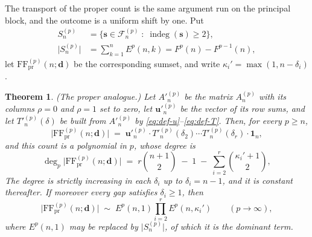 \documentclass[11pt, a4paper, abstract=yes]{scrartcl}
\theoremstyle{definition}
\theoremstyle{remark}
\theoremstyle{plain}
\newtheorem{theorem}[definition]{Theorem}
\newcommand{\vek}[1]{\boldsymbol{#1}}
\newcommand{\indeg}{\operatorname{indeg}}
\begin{document}
The transport of the proper count is the same argument run on the principal block, and the outcome
is a uniform shift by one. Put
\begin{align}
  S_n^{(p)} &= \bigl\lbrace\vek s\in\mathcal F_n^{(p)}\;:\;\indeg(\vek s)\ge2\bigr\rbrace,\label{eq:def-Snp}\\
  \lvert S_n^{(p)}\rvert &= \sum_{k=1}^{n}E^p(n,k)=F^p(n)-F^{p-1}(n) ,\label{eq:card-Snp}
\end{align}
let \(\mathrm{FF}^{(p)}_{\mathrm{pr}}(n;\vek d)\) be the corresponding sumset, and write
\(\kappa_i'=\max(1,n-\delta_i)\).

\begin{theorem}
(\emph{The proper analogue.}) Let \(A'^{(p)}_n\) be the matrix \(A^{(p)}_n\) with its columns \(\rho=0\)
and \(\rho=1\) set to zero, let \(\vek u'^{(p)}_n\) be the vector of its row sums, and let
\(T'^{(p)}_n(\delta)\) be built from \(A'^{(p)}_n\) by \eqref{eq:def-u}--\eqref{eq:def-T}. Then, for every
\(p\ge n\),
\begin{equation}\label{eq:proper-p-product}
  \lvert\mathrm{FF}^{(p)}_{\mathrm{pr}}(n;\vek d)\rvert
  \;=\;\vek u'^{(p)}_n\cdot T'^{(p)}_n(\delta_2)\cdots T'^{(p)}_n(\delta_r)\cdot\vek 1_n ,
\end{equation}
and this count is a polynomial in \(p\), whose degree is
\begin{equation}\label{eq:proper-degree-in-p}
  \deg_p\lvert\mathrm{FF}^{(p)}_{\mathrm{pr}}(n;\vek d)\rvert
   \;=\; r\binom{n+1}{2}\;-\;1\;-\;\sum_{i=2}^{r}\binom{\kappa_i'+1}{2},
\end{equation}
The degree is strictly increasing in each \(\delta_i\) up to \(\delta_i=n-1\), and it is constant
thereafter. If moreover every gap satisfies \(\delta_i\ge1\), then
\begin{equation}\label{eq:proper-lc-in-p}
  \lvert\mathrm{FF}^{(p)}_{\mathrm{pr}}(n;\vek d)\rvert\;\sim\;E^p(n,1)\prod_{i=2}^{r}E^p(n,\kappa_i')
  \qquad(p\to\infty),
\end{equation}
where \(E^p(n,1)\) may be replaced by \(\lvert S_n^{(p)}\rvert\), of which it is the dominant term.
\label{thm-asymptotics-p-proper}
\end{theorem}
\end{document}
